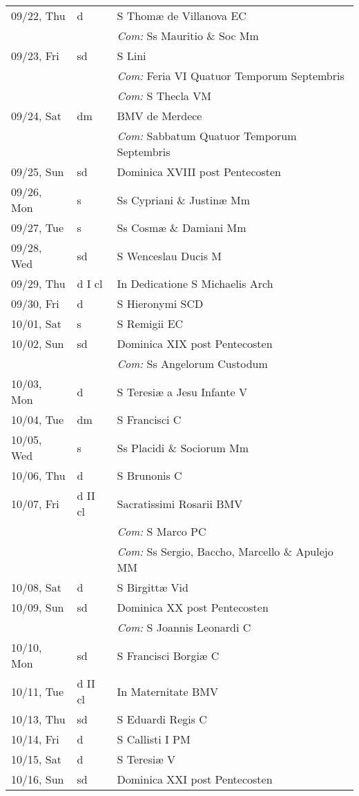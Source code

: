 \documentclass[10pt]{article}
\begin{document}
\begin{longtable}{ l l l }
09/22, Thu & d & S Thomæ de Villanova EC\\
 & & \textit{Com:} Ss Mauritio \& Soc Mm\\
09/23, Fri & sd & S Lini\\
 & & \textit{Com:} Feria VI Quatuor Temporum Septembris\\
 & & \textit{Com:} S Thecla VM\\
09/24, Sat & dm & BMV de Merdece\\
 & & \textit{Com:} Sabbatum Quatuor Temporum Septembris\\
09/25, Sun & sd & Dominica XVIII post Pentecosten\\
09/26, Mon & s & Ss Cypriani \& Justinæ Mm\\
09/27, Tue & s & Ss Cosmæ \& Damiani Mm\\
09/28, Wed & sd & S Wenceslau Ducis M\\
09/29, Thu & d I cl & In Dedicatione S Michaelis Arch\\
09/30, Fri & d & S Hieronymi SCD\\
10/01, Sat & s & S Remigii EC\\
10/02, Sun & sd & Dominica XIX post Pentecosten\\
 & & \textit{Com:} Ss Angelorum Custodum\\
10/03, Mon & d & S Teresiæ a Jesu Infante V\\
10/04, Tue & dm & S Francisci C\\
10/05, Wed & s & Ss Placidi \& Sociorum Mm\\
10/06, Thu & d & S Brunonis C\\
10/07, Fri & d II cl & Sacratissimi Rosarii BMV\\
 & & \textit{Com:} S Marco PC\\
 & & \textit{Com:} Ss Sergio, Baccho, Marcello \& Apulejo MM\\
10/08, Sat & d & S Birgittæ Vid\\
10/09, Sun & sd & Dominica XX post Pentecosten\\
 & & \textit{Com:} S Joannis Leonardi C\\
10/10, Mon & sd & S Francisci Borgiæ C\\
10/11, Tue & d II cl & In Maternitate BMV\\
10/13, Thu & sd & S Eduardi Regis C\\
10/14, Fri & d & S Callisti I PM\\
10/15, Sat & d & S Teresiæ V\\
10/16, Sun & sd & Dominica XXI post Pentecosten\\

\end{longtable}
\end{document}
